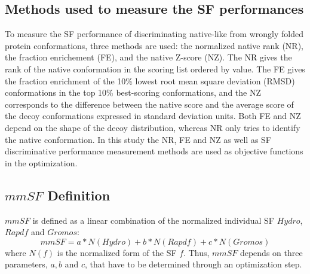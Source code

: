 \documentclass[a4paper,20pt,notitlepage,openbib]{article}
\begin{document}
\subsection{Methods used to measure the SF performances}
To measure the SF performance of discriminating native-like from wrongly folded protein conformations, three methods are used: the normalized native rank (NR), the fraction enrichement (FE), and the native Z-score (NZ). The NR gives the rank of the native conformation in the scoring list ordered by value. The FE gives the fraction enrichment of the 10\% lowest root mean square deviation (RMSD) conformations in the top 10\% best-scoring conformations, and the NZ corresponds to the difference between the native score and the average score of the decoy conformations expressed in standard deviation units. Both FE and NZ depend on the shape of the decoy distribution, whereas NR only tries to identify the native conformation. In this study the NR, FE and NZ as well as SF discriminative performance measurement methods are used as objective functions in the optimization.
\subsection{$mmSF$ Definition}
$mmSF$ is defined as a linear combination of the normalized individual SF $Hydro$, $Rapdf$ and $Gromos$:
\begin{equation}
\label{equation_1}
mmSF = a * N(Hydro) + b * N(Rapdf) + c * N(Gromos)
\end{equation}
where $N(f)$ is the normalized form of the SF $f$. Thus, $mmSF$ depends on three parameters, $a, b$ and $c$, that have to be determined through an optimization step.
\end{document}
